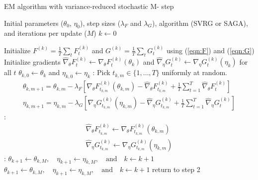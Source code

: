 \begin{algorithm}
\caption{EM algorithm with variance-reduced stochastic M- step}\label{alg:EM-SO}
\begin{algorithmic}[1]
\Require Initial parameters ($\theta_{0}$, $\eta_{0}$), step sizes ($\lambda_F$ and $\lambda_G$), algorithm (SVRG or SAGA), and iterations per update ($M$)
%
\State $k \gets 0$

%
\State Initialize $F^{(k)} = \frac{1}{T} \sum_t F_t^{(k)}$ and $G^{(k)} = \frac{1}{T} \sum_t G_t^{(k)}$ using (\ref{eqn:F}) and (\ref{eqn:G})
%
\vspace{10pt}
%
\State Initialize gradients $\widehat \nabla_\theta F_t^{(k)} \gets \nabla_\theta F_t^{(k)} (\theta_k)$ and $\widehat \nabla_\eta G_t^{(k)} \gets \nabla_\eta G_t^{(k)} (\eta_k)$ for all $t$
%
\State $\theta_{k,0} \gets \theta_k$ and $\eta_{k,0} \gets \eta_k$
%
:
    \State Pick $t_{k,m} \in \{1,\ldots,T\}$ uniformly at random.
    \State
    \begin{gather}
        \theta_{k,m+1} = \theta_{k,m} - \lambda_F \left[\nabla_\theta F_{t_{k,m}}^{(k)}(\theta_{k,m}) - \widehat \nabla_\theta F_{t_{k,m}}^{(k)} + \frac{1}{T} \sum_{t=1}^T \widehat \nabla_\theta F^{(k)}_{t} \right] \\
        \eta_{k,m+1} = \eta_{k,m} - \lambda_G \left[\nabla_\eta G_{t_{k,m}}^{(k)}(\eta_{k,m}) - \widehat \nabla_\eta G_{t_{k,m}}^{(k)} + \frac{1}{T} \sum_{t=1}^T \widehat \nabla_\eta G^{(k)}_{t} \right]
    \end{gather}
    :
        \begin{gather}
            \widehat \nabla_\theta F_{t_{k,m}}^{(k)} \gets \nabla_\theta F_{t_{k,m}}^{(k)}(\theta_{k,m}) \\
            \widehat \nabla_\eta G_{t_{k,m}}^{(k)} \gets \nabla_\eta G_{t_{k,m}}^{(k)}(\eta_{k,m})
        \end{gather}
    \EndIf
\EndFor
%
\vspace{10pt}
%
:
    \State $\theta_{k+1} \gets \theta_{k,M}, \quad \eta_{k+1} \gets \eta_{k,M}, \quad \text{and} \quad k \gets k+1$
    \State $\theta_{k+1} \gets \theta_{k,M}, \quad \eta_{k+1} \gets \eta_{k,M}, \quad \text{and} \quad k \gets k+1$
\EndIf
%
\vspace{10pt}
%
\State return to step 2
\end{algorithmic}
\end{algorithm}

